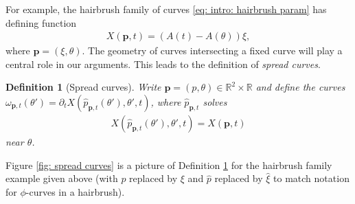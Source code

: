 \documentclass[12pt]{amsart}
\numberwithin{equation}{section}
\newtheorem{definition}[lemma]{Definition}
\newcommand{\R}{\mathbb{R}}
\newcommand{\1}{\mathbbm{1}}
\newcommand{\p}{\mathbf p}
\begin{document}
For example, the hairbrush family of curves \eqref{eq: intro: hairbrush param} has defining function 
\begin{align}
    X(\p,t) = (A(t) - A(\theta))\xi, 
\end{align}
where $\p = (\xi,\theta)$.
The geometry of curves intersecting a fixed curve will play a central role in our arguments. This leads to the definition of \emph{spread curves}.

\begin{definition}[Spread curves]\label{def: spread curves}
     Write $\p = (p,\theta) \in \R^2 \times \R$ and define the curves $\omega_{\p, t}(\theta') = \partial_t X(\hat p_{\p,t}(\theta'), \theta', t)$, where $\hat p_{\p,t}$ solves
    \begin{align}
        X(\hat p_{\p,t}(\theta'),\theta', t) = X(\p, t) 
    \end{align}
    near $\theta$.
\end{definition}
Figure \ref{fig: spread curves} is a picture of Definition \ref{def: spread curves} for the hairbrush family example given above (with $p$ replaced by $\xi$ and $\hat p$ replaced by $\hat \xi$ to match notation for $\phi$-curves in a hairbrush).
\end{document}
